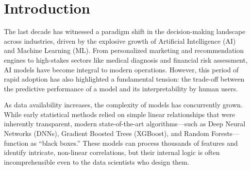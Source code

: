 \documentclass[12pt, a4paper]{article}
\begin{document}
\begin{abstract}
The rapid proliferation of Artificial Intelligence (AI) and Machine Learning (ML) in critical domains like healthcare and finance has raised significant concerns regarding the ``black-box'' nature of advanced models. While ensemble methods and deep learning offer high predictive accuracy, they often lack transparency, making it difficult for stakeholders to trust or audit their decisions. This paper proposes a comprehensive framework for Explainable AI (XAI) to bridge the gap between model performance and human interpretability. Focusing on a Loan Approval Prediction system, we implement and evaluate post-hoc explanation techniques, specifically Shapley Additive Explanations (SHAP). We explore the mathematical foundations of attribution-based explanation and the integration of these techniques into real-world workflows. Our findings demonstrate that providing both local and global explanations enhances user trust, ensures regulatory compliance (such as GDPR's right to explanation), and allows developers to identify potential biases. The proposed system offers a transparent interface that transforms complex algorithmic outputs into actionable, human-readable insights.
\end{abstract}

\newpage

\section{Introduction}

The last decade has witnessed a paradigm shift in the decision-making landscape across industries, driven by the explosive growth of Artificial Intelligence (AI) and Machine Learning (ML). From personalized marketing and recommendation engines to high-stakes sectors like medical diagnosis and financial risk assessment, AI models have become integral to modern operations. However, this period of rapid adoption has also highlighted a fundamental tension: the trade-off between the predictive performance of a model and its interpretability by human users.

As data availability increases, the complexity of models has concurrently grown. While early statistical methods relied on simple linear relationships that were inherently transparent, modern state-of-the-art algorithms—such as Deep Neural Networks (DNNs), Gradient Boosted Trees (XGBoost), and Random Forests—function as ``black boxes.'' These models can process thousands of features and identify intricate, non-linear correlations, but their internal logic is often incomprehensible even to the data scientists who design them.
\end{document}
